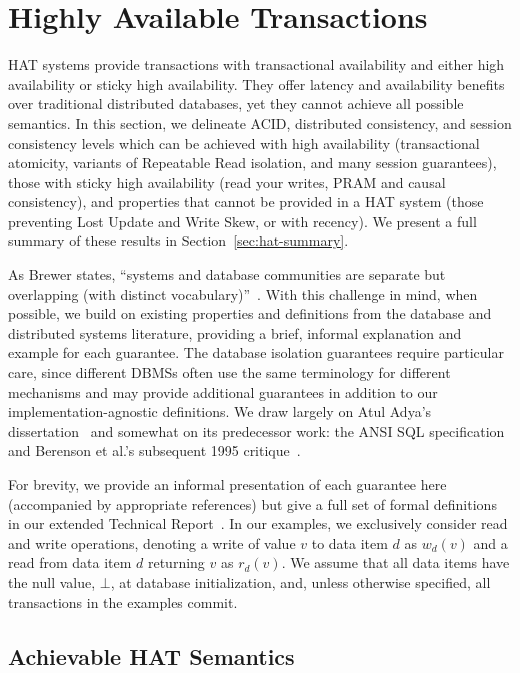 
\section{Highly Available Transactions}
\label{sec:hats}

HAT systems provide transactions with transactional availability and
either high availability or sticky high availability. They offer
latency and availability benefits over traditional distributed
databases, yet they cannot achieve all possible semantics. In this
section, we delineate ACID, distributed consistency, and session
consistency levels which can be achieved with high availability
(transactional atomicity, variants of Repeatable Read isolation, and
many session guarantees), those with sticky high availability (read
your writes, PRAM and causal consistency), and properties that cannot
be provided in a HAT system (those preventing Lost Update and Write
Skew, or with recency).  We present a full summary of these results in
Section~\ref{sec:hat-summary}.

As Brewer states, ``systems and database communities are separate but
overlapping (with distinct vocabulary)''~\cite{brewer-slides}. With
this challenge in mind, when possible, we build on existing properties
and definitions from the database and distributed systems literature,
providing a brief, informal explanation and example for each
guarantee. The database isolation guarantees require particular care,
since different DBMSs often use the same terminology for different
mechanisms and may provide additional guarantees in addition to our
implementation-agnostic definitions.  We draw largely on Atul Adya's
dissertation~\cite{adya} and somewhat on its predecessor work: the
ANSI SQL specification~\cite{ansi-sql} and Berenson et al.'s
subsequent 1995 critique~\cite{ansicritique}.

For brevity, we provide an informal presentation of each guarantee
here (accompanied by appropriate references) but give a full set of
formal definitions in our extended Technical Report~\cite{hat-tr}. In
our examples, we exclusively consider read and write operations,
denoting a write of value $v$ to data item $d$ as $w_d(v)$ and a read
from data item $d$ returning $v$ as $r_d(v)$. We assume that all data
items have the null value, $\bot$, at database initialization, and,
unless otherwise specified, all transactions in the examples commit.

\subsection{Achievable HAT Semantics}

